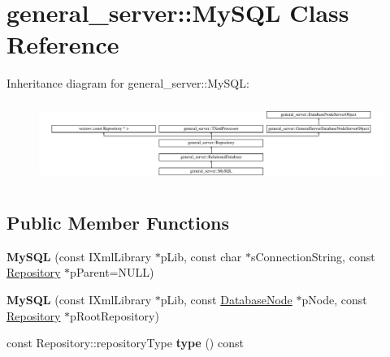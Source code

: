 \hypertarget{classgeneral__server_1_1MySQL}{\section{general\-\_\-server\-:\-:\-My\-S\-Q\-L \-Class \-Reference}
\label{classgeneral__server_1_1MySQL}
}
\-Inheritance diagram for general\-\_\-server\-:\-:\-My\-S\-Q\-L\-:\begin{figure}[H]
\begin{center}
\leavevmode
\includegraphics[height=2.621723cm]{classgeneral__server_1_1MySQL}
\end{center}
\end{figure}
\subsection*{\-Public \-Member \-Functions}
\begin{DoxyCompactItemize}
\item 
\hypertarget{classgeneral__server_1_1MySQL_a925435666bda835e95b8125d4e99d940}{{\bfseries \-My\-S\-Q\-L} (const \-I\-Xml\-Library $\ast$p\-Lib, const char $\ast$s\-Connection\-String, const \hyperlink{classgeneral__server_1_1Repository}{\-Repository} $\ast$p\-Parent=\-N\-U\-L\-L)}\label{classgeneral__server_1_1MySQL_a925435666bda835e95b8125d4e99d940}

\item 
\hypertarget{classgeneral__server_1_1MySQL_ae0d5629c7a9f1fa734456cf3c675b199}{{\bfseries \-My\-S\-Q\-L} (const \-I\-Xml\-Library $\ast$p\-Lib, const \hyperlink{classgeneral__server_1_1DatabaseNode}{\-Database\-Node} $\ast$p\-Node, const \hyperlink{classgeneral__server_1_1Repository}{\-Repository} $\ast$p\-Root\-Repository)}\label{classgeneral__server_1_1MySQL_ae0d5629c7a9f1fa734456cf3c675b199}

\item 
\hypertarget{classgeneral__server_1_1MySQL_a2765db990746bd32b7c99ff8a1363841}{const \-Repository\-::repository\-Type {\bfseries type} () const }\label{classgeneral__server_1_1MySQL_a2765db990746bd32b7c99ff8a1363841}

\end{DoxyCompactItemize}
